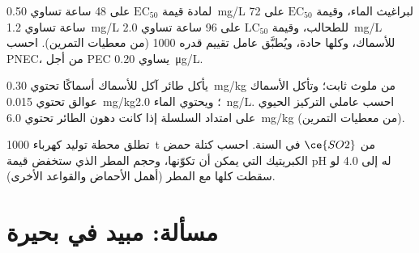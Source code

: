 \begin{exercise}[$\star\star\star$]\label{exo:b3:environmental-toxicology:10}
لمادة قيمة $\mathrm{EC_{50}}$ على 48 ساعة تساوي \qty{0.50}{mg/L} لبراغيث الماء، وقيمة $\mathrm{EC_{50}}$ على 72 ساعة تساوي \qty{1.2}{mg/L} للطحالب،
وقيمة $\mathrm{LC_{50}}$ على 96 ساعة تساوي \qty{2.0}{mg/L} للأسماك، وكلها حادة، ويُطبَّق عامل تقييم قدره 1000
(من معطيات التمرين). احسب PNEC،  من أجل PEC يساوي \qty{0.20}{\micro g/L}.
\end{exercise}

\begin{exercise}[$\star\star\star$]\label{exo:b3:environmental-toxicology:11}
يأكل طائر آكل للأسماك أسماكًا تحتوي \qty{0.30}{mg/kg} من ملوث ثابت؛ وتأكل الأسماك
عوالق تحتوي \qty{0.015}{mg/kg}؛ ويحتوي الماء \qty{2.0}{ng/L}. احسب عاملي التركيز الحيوي 
 على امتداد السلسلة إذا كانت دهون الطائر تحتوي \qty{6.0}{mg/kg} (من معطيات
التمرين).
\end{exercise}

\begin{exercise}[$\star\star\star$]\label{exo:b3:environmental-toxicology:12}
تطلق محطة توليد كهرباء \qty{1000}{t} من $\ce{SO2}$ في السنة. احسب كتلة حمض الكبريتيك التي يمكن أن تكوّنها،
وحجم المطر الذي ستخفض قيمة pH له إلى 4.0 لو سقطت كلها مع المطر (أهمل الأحماض
والقواعد الأخرى).
\end{exercise}

\section{مسألة: مبيد في بحيرة}

